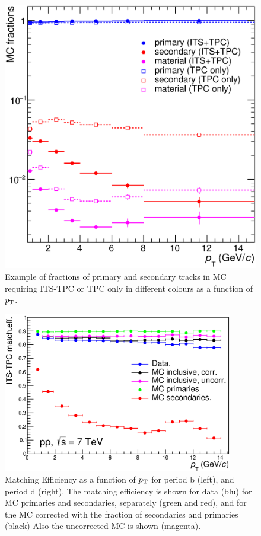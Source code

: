 \begin{figure}[!htb]
\begin{center}
\includegraphics[width=.50\textwidth]{FigCap4/MCfractions_ESDTrOnly_VsPt_PiK.eps}
\caption{Example of fractions of primary and secondary tracks in MC requiring ITS-TPC or TPC only in different colours as a function of $p_{\rm T}$.}
\label{fig:MCfractions}
\end{center}
\end{figure}

\begin{figure}[!htb]
\begin{center}
\includegraphics[height=7cm]{FigCap4/ITSTPCmatchEff_10bpass4_vsPt.eps}
\caption{Matching Efficiency as a function of $p_{\rm T}$ for period b (left), and period d (right). The matching efficiency is shown for data (blu) for MC primaries and secondaries, separately (green and red), and for the MC corrected with the fraction of secondaries and primaries (black) Also the uncorrected MC is shown (magenta). }
\label{fig:CorrMatchEffVsPt}
\end{center}
\end{figure}

